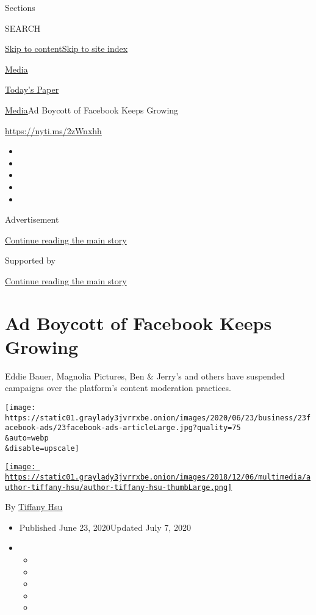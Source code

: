 Sections

SEARCH

\protect\hyperlink{site-content}{Skip to
content}\protect\hyperlink{site-index}{Skip to site index}

\href{https://www.nytimes3xbfgragh.onion/section/business/media}{Media}

\href{https://myaccount.nytimes3xbfgragh.onion/auth/login?response_type=cookie\&client_id=vi}{}

\href{https://www.nytimes3xbfgragh.onion/section/todayspaper}{Today's
Paper}

\href{/section/business/media}{Media}\textbar{}Ad Boycott of Facebook
Keeps Growing

\url{https://nyti.ms/2zWnxhh}

\begin{itemize}
\item
\item
\item
\item
\item
\end{itemize}

Advertisement

\protect\hyperlink{after-top}{Continue reading the main story}

Supported by

\protect\hyperlink{after-sponsor}{Continue reading the main story}

\hypertarget{ad-boycott-of-facebook-keeps-growing}{%
\section{Ad Boycott of Facebook Keeps
Growing}\label{ad-boycott-of-facebook-keeps-growing}}

Eddie Bauer, Magnolia Pictures, Ben \& Jerry's and others have suspended
campaigns over the platform's content moderation practices.

\texttt{[image: https://static01.graylady3jvrrxbe.onion/images/2020/06/23/business/23facebook-ads/23facebook-ads-articleLarge.jpg?quality=75\\\&auto=webp\\\&disable=upscale]}

\href{https://www.nytimes3xbfgragh.onion/by/tiffany-hsu}{\texttt{[image: https://static01.graylady3jvrrxbe.onion/images/2018/12/06/multimedia/author-tiffany-hsu/author-tiffany-hsu-thumbLarge.png]}}

By \href{https://www.nytimes3xbfgragh.onion/by/tiffany-hsu}{Tiffany Hsu}

\begin{itemize}
\item
  Published June 23, 2020Updated July 7, 2020
\item
  \begin{itemize}
  \item
  \item
  \item
  \item
  \item
  \end{itemize}
\end{itemize}


